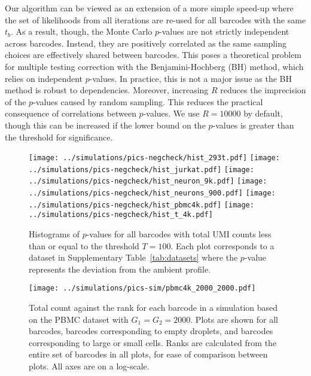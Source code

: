 \documentclass{article}
\begin{document}
Our algorithm can be viewed as an extension of a more simple speed-up where the set of likelihoods from all iterations are re-used for all barcodes with the same $t_b$.
As a result, though, the Monte Carlo $p$-values are not strictly independent across barcodes.
Instead, they are positively correlated as the same sampling choices are effectively shared between barcodes.
This poses a theoretical problem for multiple testing correction with the Benjamini-Hochberg (BH) method, which relies on independent $p$-values.
In practice, this is not a major issue as the BH method is robust to dependencies.
Moreover, increasing $R$ reduces the imprecision of the $p$-values caused by random sampling.
This reduces the practical consequence of correlations between $p$-values.
We use $R=10000$ by default, though this can be increased if the lower bound on the $p$-values \cite{phipson2010permutation} is greater than the threshold for significance.




\newpage
\begin{figure}[btp]
    \begin{center}
        \texttt{[image: ../simulations/pics-negcheck/hist\_293t.pdf]}
        \texttt{[image: ../simulations/pics-negcheck/hist\_jurkat.pdf]}
        \texttt{[image: ../simulations/pics-negcheck/hist\_neuron\_9k.pdf]}
        \texttt{[image: ../simulations/pics-negcheck/hist\_neurons\_900.pdf]}
        \texttt{[image: ../simulations/pics-negcheck/hist\_pbmc4k.pdf]}
        \texttt{[image: ../simulations/pics-negcheck/hist\_t\_4k.pdf]}
    \end{center}
    \caption{Histograms of $p$-values for all barcodes with total UMI counts less than or equal to the threshold $T=100$.
        Each plot corresponds to a dataset in Supplementary Table~\ref{tab:datasets} where the $p$-value represents the deviation from the ambient profile.
    }
    \label{fig:negative}
\end{figure}

\begin{figure}[btp]
    \begin{center}
        \texttt{[image: ../simulations/pics-sim/pbmc4k\_2000\_2000.pdf]}
    \end{center}
\caption{Total count against the rank for each barcode in a simulation based on the PBMC dataset with $G_1=G_2=2000$.
Plots are shown for all barcodes, barcodes corresponding to empty droplets, and barcodes corresponding to large or small cells.
Ranks are calculated from the entire set of barcodes in all plots, for ease of comparison between plots.
All axes are on a log-scale.}
\end{figure}
\end{document}
